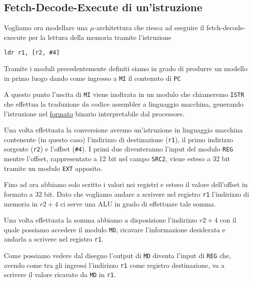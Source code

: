 \subsection{Fetch-Decode-Execute di un'istruzione}
Vogliamo ora modellare una $\mu$-architettura che riesca ad eseguire il fetch-decode-execute per la
lettura della memoria tramite l'istruzione
\begin{verbatim}
ldr r1, [r2, #4]
\end{verbatim}
Tramite i moduli precedentemente definiti siamo in grado di produrre un modello in primo luogo
dando come ingresso a \verb|MI| il contenuto di \verb|PC|
\begin{center}
	
\end{center}
A questo punto l'uscita di \verb|MI| viene inoltrata in un modulo che chiameremo \verb|ISTR| che
effettua la traduzione da codice assembler a linguaggio macchina, generando l'istruzione nel
\hyperref[sz: formato]{formato} binario interpretabile dal processore.

Una volta effettuata la conversione avremo un'istruzione in linguaggio macchina contenente (in
questo caso) l'indirizzo di destinazione (\verb|r1|), il primo indirizzo sorgente (\verb|r2|) e
l'offset (\verb|#4|). I primi due diventeranno l'input del modulo \verb|REG| mentre l'offset,
rappresentato a 12 bit nel campo \verb|SRC2|, viene esteso a 32 bit tramite un modulo \verb|EXT|
apposito.
\begin{center}
	
\end{center}
Fino ad ora abbiamo solo scritto i valori nei registri e esteso il valore dell'offset in formato a
32 bit. Dato che vogliamo andare a scrivere nel registro \verb|r1| l'indirizzo di memoria in $r2+4$
ci serve una ALU in grado di effettuare tale somma.

Una volta effettuata la somma abbiamo a disposizione l'indirizzo $r2 + 4$ con il quale possiamo
accedere il modulo \verb|MD|, ricavare l'informazione desiderata e andarla a scrivere nel registro
\verb|r1|.
\begin{center}
	
\end{center}
Come possiamo vedere dal disegno l'output di \verb|MD| diventa l'input di \verb|REG| che, avendo
come tra gli ingressi l'indirizzo \verb|r1| come registro destinazione, va a scrivere il valore
ricavato da \verb|MD| in \verb|r1|.

